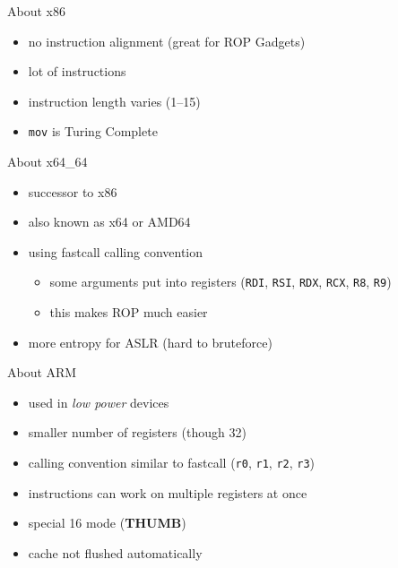 \documentclass[beamer]{uibk}
\begin{document}
\begin{frame}{About x86}
    \begin{itemize}
        \item no instruction alignment (great for ROP Gadgets)
        \item lot of instructions
        \item instruction length varies (\SIrange{1}{15}{\byte})
        \item \texttt{mov} is Turing Complete
    \end{itemize}
\end{frame}

\begin{frame}{About x64\_64}
    \begin{itemize}
        \item successor to x86
        \item also known as x64 or AMD64
        \item using fastcall calling convention
            \begin{itemize}
                \item some arguments put into registers (\texttt{RDI},
                    \texttt{RSI}, \texttt{RDX}, \texttt{RCX}, \texttt{R8},
                    \texttt{R9})
                \item this makes ROP much easier
            \end{itemize}
        \item more entropy for ASLR (hard to bruteforce)
    \end{itemize}
\end{frame}

\begin{frame}{About ARM}
    \begin{itemize}
        \item used in \emph{low power} devices
        \item smaller number of registers (though \SI{32}{\bit})
        \item calling convention similar to fastcall (\texttt{r0}, \texttt{r1},
            \texttt{r2}, \texttt{r3})
        \item instructions can work on multiple registers at once
        \item special \SI{16}{\bit} mode (\textbf{THUMB})
        \item cache not flushed automatically
    \end{itemize}
\end{frame}
\end{document}
